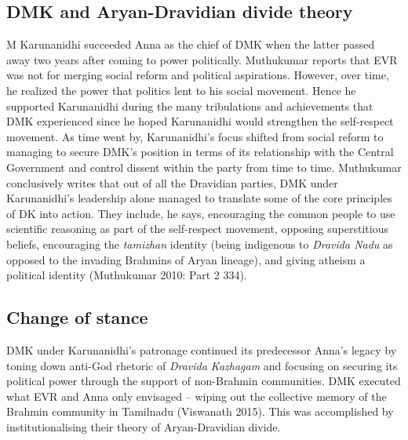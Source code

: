 \subsection*{DMK and Aryan-Dravidian divide theory}

M Karunanidhi succeeded Anna as the chief of DMK when the latter passed away two years after coming to power politically. Muthukumar reports that EVR was not for merging social reform and political aspirations. However, over time, he realized the power that politics lent to his social movement. Hence he supported Karunanidhi during the many tribulations and achievements that DMK experienced since he hoped Karunanidhi would strengthen the self-respect movement. As time went by, Karunanidhi’s focus shifted from social reform to managing to secure DMK’s position in terms of its relationship with the Central Government and control dissent within the party from time to time. Muthukumar conclusively writes that out of all the Dravidian parties, DMK under Karunanidhi’s leadership alone managed to translate some of the core principles of DK into action. They include, he says, encouraging the common people to use scientific reasoning as part of the self-respect movement, opposing superstitious beliefs, encouraging the \textit{tamizhan} identity (being indigenous to \textit{Dravida Nadu} as opposed to the invading Brahmins of Aryan lineage), and giving atheism a political identity (Muthukumar 2010: Part 2 334).


\subsection*{Change of stance}

DMK under Karunanidhi’s patronage continued its predecessor Anna’s legacy by toning down anti-God rhetoric of \textit{Dravida Kazhagam} and focusing on securing its political power through the support of non-Brahmin communities. DMK executed what EVR and Anna only envisaged – wiping out the collective memory of the Brahmin community in Tamilnadu (Viswanath 2015). This was accomplished by institutionalising their theory of Aryan-Dravidian divide.

